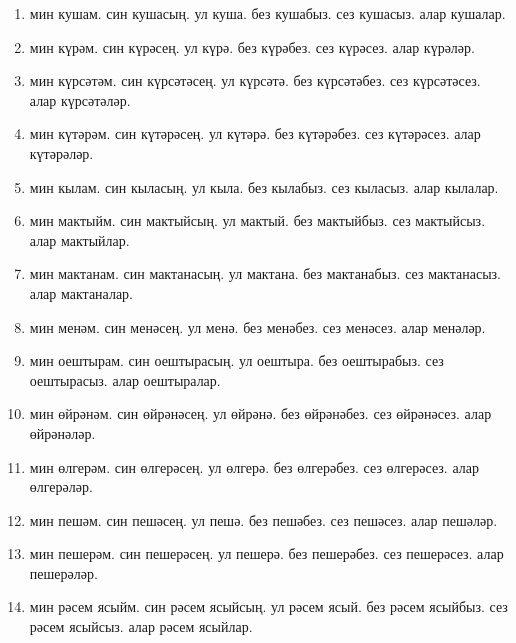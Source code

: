\documentclass{article}
\begin{document}
\begin{enumerate}
    \item
    мин кушам.
    син кушасың.
    ул куша.
    без кушабыз.
    сез кушасыз.
    алар кушалар.

    \item
    мин күрәм.
    син күрәсең.
    ул күрә.
    без күрәбез.
    сез күрәсез.
    алар күрәләр.

    \item
    мин күрсәтәм.
    син күрсәтәсең.
    ул күрсәтә.
    без күрсәтәбез.
    сез күрсәтәсез.
    алар күрсәтәләр.

    \item
    мин күтәрәм.
    син күтәрәсең.
    ул күтәрә.
    без күтәрәбез.
    сез күтәрәсез.
    алар күтәрәләр.

    \item
    мин кылам.
    син кыласың.
    ул кыла.
    без кылабыз.
    сез кыласыз.
    алар кылалар.

    \item
    мин мактыйм.
    син мактыйсың.
    ул мактый.
    без мактыйбыз.
    сез мактыйсыз.
    алар мактыйлар.

    \item
    мин мактанам.
    син мактанасың.
    ул мактана.
    без мактанабыз.
    сез мактанасыз.
    алар мактаналар.

    \item
    мин менәм.
    син менәсең.
    ул менә.
    без менәбез.
    сез менәсез.
    алар менәләр.

    \item
    мин оештырам.
    син оештырасың.
    ул оештыра.
    без оештырабыз.
    сез оештырасыз.
    алар оештыралар.

    \item
    мин өйрәнәм.
    син өйрәнәсең.
    ул өйрәнә.
    без өйрәнәбез.
    сез өйрәнәсез.
    алар өйрәнәләр.

    \item
    мин өлгерәм.
    син өлгерәсең.
    ул өлгерә.
    без өлгерәбез.
    сез өлгерәсез.
    алар өлгерәләр.

    \item
    мин пешәм.
    син пешәсең.
    ул пешә.
    без пешәбез.
    сез пешәсез.
    алар пешәләр.

    \item
    мин пешерәм.
    син пешерәсең.
    ул пешерә.
    без пешерәбез.
    сез пешерәсез.
    алар пешерәләр.

    \item
    мин рәсем ясыйм.
    син рәсем ясыйсың.
    ул рәсем ясый.
    без рәсем ясыйбыз.
    сез рәсем ясыйсыз.
    алар рәсем ясыйлар.


\end{enumerate}
\end{document}
